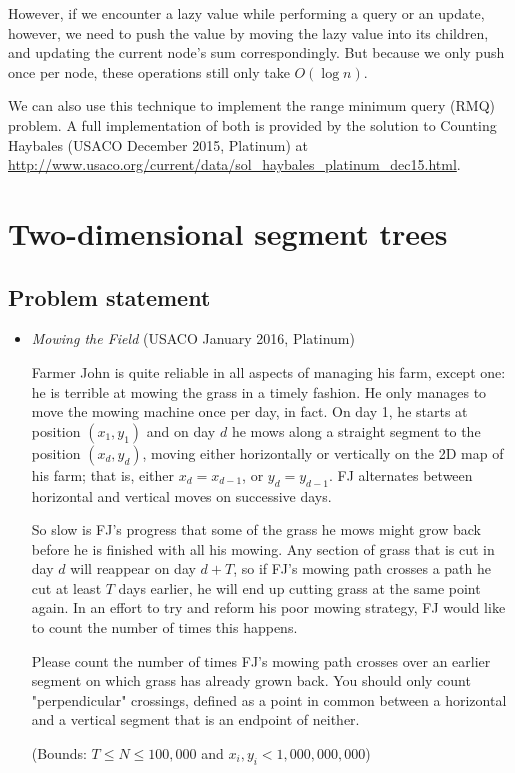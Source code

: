 \documentclass{article}
\begin{document}
However, if we encounter a lazy value while performing a query or an update, however, we need to push the value by moving the lazy value into its children, and updating the current node's sum correspondingly. But because we only push once per node, these operations still only take $O(\log n)$.

We can also use this technique to implement the range minimum query (RMQ) problem. A full implementation of both is provided by the solution to Counting Haybales (USACO December 2015, Platinum) at \url{http://www.usaco.org/current/data/sol_haybales_platinum_dec15.html}.


\section{Two-dimensional segment trees}

\subsection{Problem statement}

\begin{itemize}[leftmargin=0pt]
\item[\label={}]
\textit{Mowing the Field} (USACO January 2016, Platinum)

Farmer John is quite reliable in all aspects of managing his farm, except one: he is terrible at mowing the grass in a timely fashion. He only manages to move the mowing machine once per day, in fact. On day 1, he starts at position $(x_1,y_1)$ and on day $d$ he mows along a straight segment to the position $(x_d,y_d)$, moving either horizontally or vertically on the 2D map of his farm; that is, either $x_d = x_{d−1}$, or $y_d = y_{d−1}$. FJ alternates between horizontal and vertical moves on successive days.

So slow is FJ's progress that some of the grass he mows might grow back before he is finished with all his mowing. Any section of grass that is cut in day $d$ will reappear on day $d+T$, so if FJ's mowing path crosses a path he cut at least $T$ days earlier, he will end up cutting grass at the same point again. In an effort to try and reform his poor mowing strategy, FJ would like to count the number of times this happens.

Please count the number of times FJ's mowing path crosses over an earlier segment on which grass has already grown back. You should only count "perpendicular" crossings, defined as a point in common between a horizontal and a vertical segment that is an endpoint of neither.

(Bounds: $T \leq N \leq 100,000$ and $x_i, y_i < 1,000,000,000$)

\end{itemize}
\end{document}
